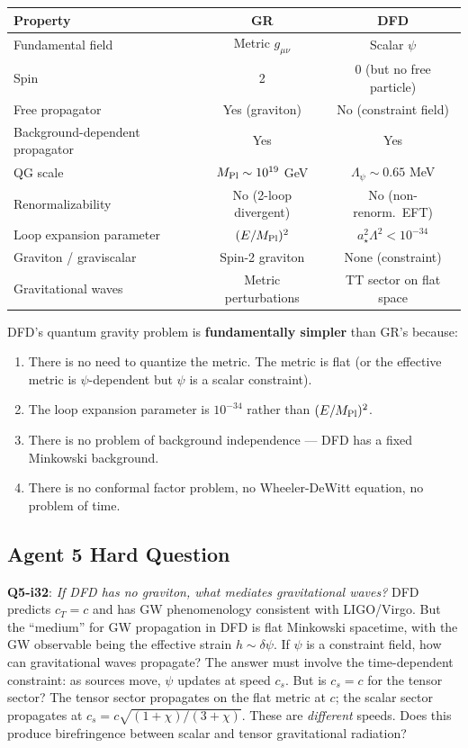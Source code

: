 \documentclass[11pt,a4paper]{article}
\begin{document}
\begin{center}
\begin{tabular}{lcc}
\toprule
\textbf{Property} & \textbf{GR} & \textbf{DFD} \\
\midrule
Fundamental field & Metric $g_{\mu\nu}$ & Scalar $\psi$ \\
Spin & 2 & 0 (but no free particle) \\
Free propagator & Yes (graviton) & No (constraint field) \\
Background-dependent propagator & Yes & Yes \\
QG scale & $M_{\rm Pl} \sim 10^{19}$ GeV & $\Lambda_\psi \sim 0.65$ MeV \\
Renormalizability & No (2-loop divergent) & No (non-renorm.\ EFT) \\
Loop expansion parameter & $(E/M_{\rm Pl})^2$ & $a_\star^2\Lambda^2 < 10^{-34}$ \\
Graviton / graviscalar & Spin-2 graviton & None (constraint) \\
Gravitational waves & Metric perturbations & TT sector on flat space \\
\bottomrule
\end{tabular}
\end{center}

DFD's quantum gravity problem is \textbf{fundamentally simpler} than GR's because:
\begin{enumerate}
\item There is no need to quantize the metric. The metric is flat (or the effective metric is $\psi$-dependent but $\psi$ is a scalar constraint).
\item The loop expansion parameter is $10^{-34}$ rather than $(E/M_{\rm Pl})^2$.
\item There is no problem of background independence --- DFD has a fixed Minkowski background.
\item There is no conformal factor problem, no Wheeler-DeWitt equation, no problem of time.
\end{enumerate}

\subsection{Agent 5 Hard Question}

\textbf{Q5-i32}: \emph{If DFD has no graviton, what mediates gravitational waves?} DFD predicts $c_T = c$ and has GW phenomenology consistent with LIGO/Virgo. But the ``medium'' for GW propagation in DFD is flat Minkowski spacetime, with the GW observable being the effective strain $h \sim \delta\psi$. If $\psi$ is a constraint field, how can gravitational waves propagate? The answer must involve the time-dependent constraint: as sources move, $\psi$ updates at speed $c_s$. But is $c_s = c$ for the tensor sector? The tensor sector propagates on the flat metric at $c$; the scalar sector propagates at $c_s = c\sqrt{(1+\chi)/(3+\chi)}$. These are \emph{different} speeds. Does this produce birefringence between scalar and tensor gravitational radiation?
\end{document}
